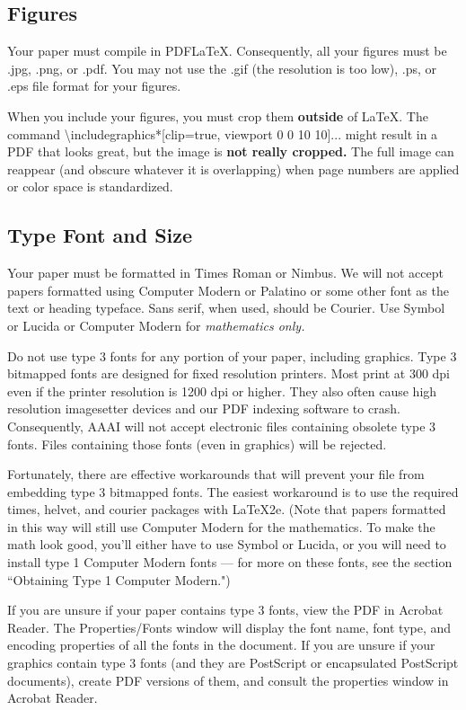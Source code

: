 \documentclass[letterpaper]{article}
\begin{document}
\subsection{Figures}
Your paper must compile in PDF\LaTeX{}. Consequently, all your figures must be .jpg, .png, or .pdf. You may not use the .gif (the resolution is too low), .ps, or .eps file format for your figures.

When you include your figures, you must crop them \textbf{outside} of \LaTeX{}. The command \textbackslash includegraphics*[clip=true, viewport 0 0 10 10]{...} might result in a PDF that looks great, but the image is \textbf{not really cropped.} The full image can reappear (and obscure whatever it is overlapping) when page numbers are applied or color space is standardized. 

\subsection{Type Font and Size}
Your paper must be formatted in Times Roman or Nimbus. We will not accept papers formatted using Computer Modern or Palatino or some other font as the text or heading typeface. Sans serif, when used, should be Courier. Use Symbol or Lucida or Computer Modern for \textit{mathematics only. } 

Do not use type 3 fonts for any portion of your paper, including graphics. Type 3 bitmapped fonts are designed for fixed resolution printers. Most print at 300 dpi even if the printer resolution is 1200 dpi or higher. They also often cause high resolution imagesetter devices and our PDF indexing software to crash. Consequently, AAAI will not accept electronic files containing obsolete type 3 fonts. Files containing those fonts (even in graphics) will be rejected. 

Fortunately, there are effective workarounds that will prevent your file from embedding type 3 bitmapped fonts. The easiest workaround is to use the required times, helvet, and courier packages with \LaTeX{}2e. (Note that papers formatted in this way will still use Computer Modern for the mathematics. To make the math look good, you'll either have to use Symbol or Lucida, or you will need to install type 1 Computer Modern fonts --- for more on these fonts, see the section ``Obtaining Type 1 Computer Modern.")

If you are unsure if your paper contains type 3 fonts, view the PDF in Acrobat Reader. The Properties/Fonts window will display the font name, font type, and encoding properties of all the fonts in the document. If you are unsure if your graphics contain type 3 fonts (and they are PostScript or encapsulated PostScript documents), create PDF versions of them, and consult the properties window in Acrobat Reader. 
\end{document}
